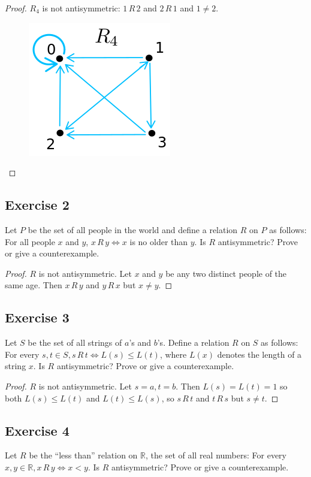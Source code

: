 \documentclass[14pt]{extarticle}
\newcommand{\R}{\mathbb{R}}
\begin{document}
\begin{proof}
\(R_4\) is not antisymmetric: \(1 \,R\, 2\) and \(2 \,R\, 1\) and \(1 \neq 2\).
\begin{figure}[ht!]
\centering
\includegraphics[scale=0.5]{../images/8.5.1.d.png}
\end{figure}
\end{proof}

\subsection{Exercise 2}
Let $P$ be the set of all people in the world and define a relation $R$ on $P$ as follows: For all people $x$ and $y$, 
\(x \,R\, y \iff x\) is no older than $y$. Is $R$ antisymmetric? Prove or give a counterexample.

\begin{proof}
$R$ is not antisymmetric. Let $x$ and $y$ be any two distinct people of the same age. Then \(x \,R\, y\) and 
\(y \,R\, x\) but \(x \neq y\).
\end{proof}

\subsection{Exercise 3}
Let $S$ be the set of all strings of $a$’s and $b$’s. Define a relation $R$ on $S$ as follows: For every \(s, t 
\in S, s \,R\, t \iff L(s) \leq L(t)\), where \(L(x)\) denotes the length of a string $x$. Is $R$ antisymmetric? 
Prove or give a counterexample.

\begin{proof}
$R$ is not antisymmetric. Let \(s = a, t = b\). Then \(L(s) = L(t) = 1\) so both \(L(s) \leq L(t)\) and \(L(t) \leq 
L(s)\), so \(s \,R\, t\) and \(t \,R\,s\) but \(s \neq t\).
\end{proof}

\subsection{Exercise 4}
Let $R$ be the “less than” relation on $\R$, the set of all real numbers: For every \(x, y \in \R, x \,R\, y \iff x < 
y\). Is $R$ antisymmetric? Prove or give a counterexample.
\end{document}
